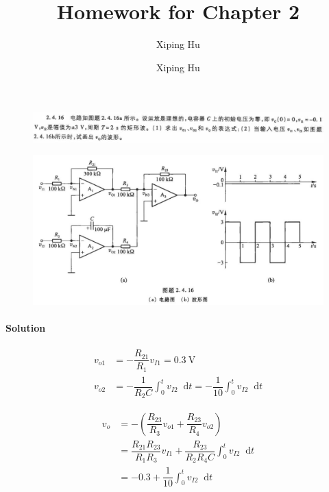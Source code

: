 \documentclass{article}
\author{Xiping Hu}
\author{Xiping Hu}
\affil{http://thehxp.tech/}
\title{Homework for Chapter 2}
\newcommand*{\md}{\mathop{}\!\mathrm{d}}
\begin{document}
\maketitle

\begin{figure}[H]
  \centering
  \includegraphics[width=\linewidth]{figures/Problem4-1}
  \label{fig:}
\end{figure}
\begin{figure}[H]
  \centering
  \includegraphics[width=\linewidth]{figures/Problem4-2}
  \label{fig:}
\end{figure}

\paragraph{Solution}

\begin{equation*}
  \begin{aligned}
    v_{o1} &= - \dfrac{R_{21}}{R_1} v_{I1} = 0.3 \  \mathrm{V} \\
    v_{o2} &= - \dfrac{1}{R_2 C} \int_0^t v_{I2} \md t = - \dfrac{1}{10} \int_0^t v_{I2} \md t 
  \end{aligned}
\end{equation*}

\begin{equation*}
  \begin{aligned}
    v_o &= - \left( \dfrac{R_{23}}{R_3} v_{o1} + \dfrac{R_{23}}{R_4} v_{o2}   \right) \\
    &= \dfrac{R_{21} R_{23}}{R_1 R_3} v_{I1} + \dfrac{R_{23}}{R_2 R_4 C} \int_0^t v_{I2} \md t \\
    &= -0.3 + \dfrac{1}{10} \int_0^t v_{I2} \md t 
  \end{aligned}
\end{equation*}
\end{document}

